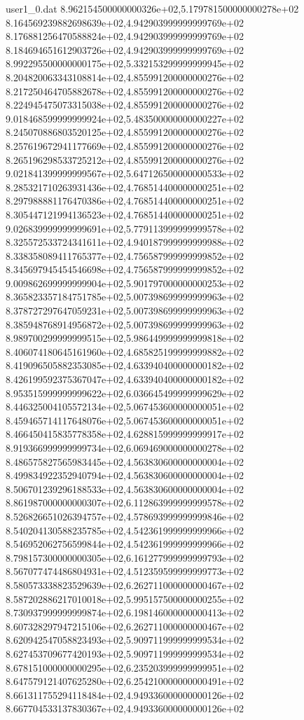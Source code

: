 \begin{filecontents}{user1_0.dat}
8.962154500000000326e+02,5.179781500000000278e+02
8.164569239882698639e+02,4.942903999999999769e+02
8.176881256470588824e+02,4.942903999999999769e+02
8.184694651612903726e+02,4.942903999999999769e+02
8.992295500000000175e+02,5.332153299999999945e+02
8.204820063343108814e+02,4.855991200000000276e+02
8.217250464705882678e+02,4.855991200000000276e+02
8.224945475073315038e+02,4.855991200000000276e+02
9.018468599999999924e+02,5.483500000000000227e+02
8.245070886803520125e+02,4.855991200000000276e+02
8.257619672941177669e+02,4.855991200000000276e+02
8.265196298533725212e+02,4.855991200000000276e+02
9.021841399999999567e+02,5.647126500000000533e+02
8.285321710263931436e+02,4.768514400000000251e+02
8.297988881176470386e+02,4.768514400000000251e+02
8.305447121994136523e+02,4.768514400000000251e+02
9.026839999999999691e+02,5.779113999999999578e+02
8.325572533724341611e+02,4.940187999999999988e+02
8.338358089411765377e+02,4.756587999999999852e+02
8.345697945454546698e+02,4.756587999999999852e+02
9.009862699999999904e+02,5.901797000000000253e+02
8.365823357184751785e+02,5.007398699999999963e+02
8.378727297647059231e+02,5.007398699999999963e+02
8.385948768914956872e+02,5.007398699999999963e+02
8.989700299999999515e+02,5.986449999999999818e+02
8.406074180645161960e+02,4.685825199999999882e+02
8.419096505882353085e+02,4.633940400000000182e+02
8.426199592375367047e+02,4.633940400000000182e+02
8.953515999999999622e+02,6.036645499999999629e+02
8.446325004105572134e+02,5.067453600000000051e+02
8.459465714117648076e+02,5.067453600000000051e+02
8.466450415835778358e+02,4.628815999999999917e+02
8.919366999999999734e+02,6.069469000000000278e+02
8.486575827565983445e+02,4.563830600000000004e+02
8.499834922352940794e+02,4.563830600000000004e+02
8.506701239296188533e+02,4.563830600000000004e+02
8.861987000000000307e+02,6.112863999999999578e+02
8.526826651026394757e+02,4.578693999999999846e+02
8.540204130588235785e+02,4.542361999999999966e+02
8.546952062756599844e+02,4.542361999999999966e+02
8.798157300000000305e+02,6.161277999999999793e+02
8.567077474486804931e+02,4.512359599999999773e+02
8.580573338823529639e+02,6.262711000000000467e+02
8.587202886217010018e+02,5.995157500000000255e+02
8.730937999999999874e+02,6.198146000000000413e+02
8.607328297947215106e+02,6.262711000000000467e+02
8.620942547058823493e+02,5.909711999999999534e+02
8.627453709677420193e+02,5.909711999999999534e+02
8.678151000000000295e+02,6.235203999999999951e+02
8.647579121407625280e+02,6.254210000000000491e+02
8.661311755294118484e+02,4.949336000000000126e+02
8.667704533137830367e+02,4.949336000000000126e+02

\end{filecontents}
